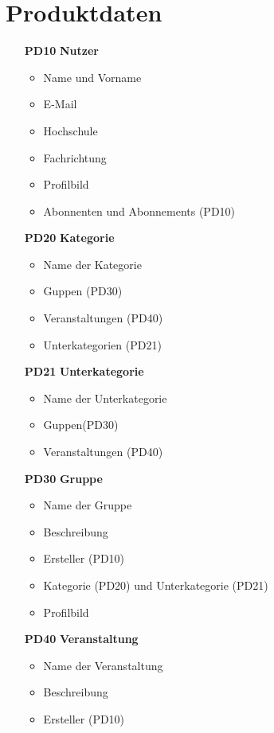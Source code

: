 \documentclass[parskip=full]{scrartcl}
\begin{document}
	\section{Produktdaten}
	\begin{itemize}
		\item[\textbf{PD10}] \textbf{Nutzer}
			\begin{itemize}[nosep]
				\item Name und Vorname
				\item E-Mail
				\item Hochschule
				\item Fachrichtung
				\item Profilbild
				\item Abonnenten und Abonnements (PD10)
			\end{itemize}
		\item[\textbf{PD20}] \textbf{Kategorie}
			\begin{itemize}[nosep]
				\item Name der Kategorie
				\item Guppen (PD30)
				\item Veranstaltungen (PD40)
				\item Unterkategorien (PD21)
			\end{itemize}
		\item[\textbf{PD21}] \textbf{Unterkategorie}
			\begin{itemize}[nosep]
				\item Name der Unterkategorie
				\item Guppen(PD30)
				\item Veranstaltungen (PD40)
			\end{itemize}
		\item[\textbf{PD30}] \textbf{Gruppe}
			\begin{itemize}
				\item Name der Gruppe
				\item Beschreibung
				\item Ersteller (PD10)
				\item Kategorie (PD20) und Unterkategorie (PD21)
				\item Profilbild
			\end{itemize}
		\item[\textbf{PD40}] \textbf{Veranstaltung}
			\begin{itemize}[nosep]
				\item Name der Veranstaltung
				\item Beschreibung
				\item Ersteller (PD10)

\end{itemize}
\end{itemize}
\end{document}
